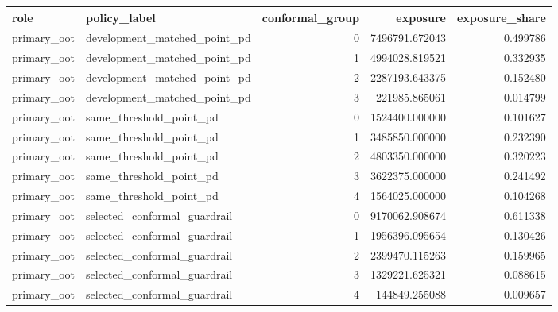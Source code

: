 \begin{tabular}{llrrr}
\toprule
role & policy\_label & conformal\_group & exposure & exposure\_share \\
\midrule
primary\_oot & development\_matched\_point\_pd & 0 & 7496791.672043 & 0.499786 \\
primary\_oot & development\_matched\_point\_pd & 1 & 4994028.819521 & 0.332935 \\
primary\_oot & development\_matched\_point\_pd & 2 & 2287193.643375 & 0.152480 \\
primary\_oot & development\_matched\_point\_pd & 3 & 221985.865061 & 0.014799 \\
primary\_oot & same\_threshold\_point\_pd & 0 & 1524400.000000 & 0.101627 \\
primary\_oot & same\_threshold\_point\_pd & 1 & 3485850.000000 & 0.232390 \\
primary\_oot & same\_threshold\_point\_pd & 2 & 4803350.000000 & 0.320223 \\
primary\_oot & same\_threshold\_point\_pd & 3 & 3622375.000000 & 0.241492 \\
primary\_oot & same\_threshold\_point\_pd & 4 & 1564025.000000 & 0.104268 \\
primary\_oot & selected\_conformal\_guardrail & 0 & 9170062.908674 & 0.611338 \\
primary\_oot & selected\_conformal\_guardrail & 1 & 1956396.095654 & 0.130426 \\
primary\_oot & selected\_conformal\_guardrail & 2 & 2399470.115263 & 0.159965 \\
primary\_oot & selected\_conformal\_guardrail & 3 & 1329221.625321 & 0.088615 \\
primary\_oot & selected\_conformal\_guardrail & 4 & 144849.255088 & 0.009657 \\
\bottomrule
\end{tabular}
